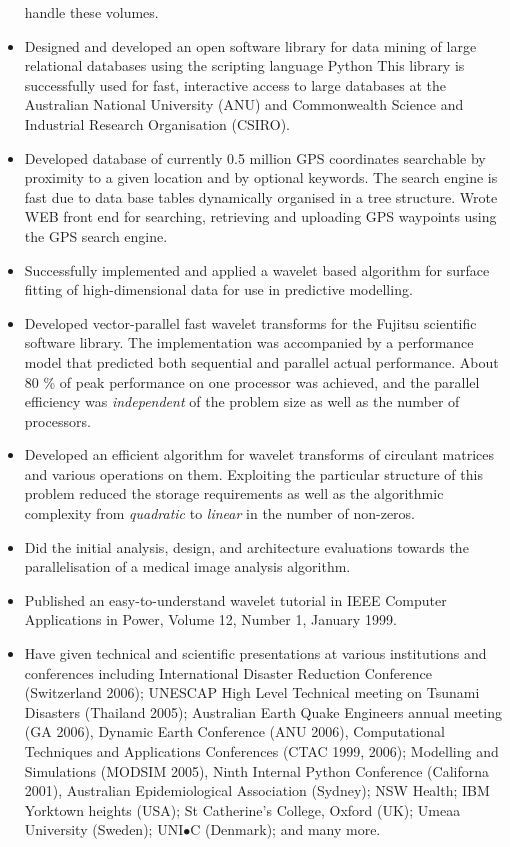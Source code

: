 \documentclass[12pt,a4paper]{article}
\begin{document}
\begin{itemize}
  handle these volumes. 
  \item Designed and developed an open software library for data mining
  of large relational databases using the scripting language Python
  This library is successfully used for fast, interactive access to large 
  databases at the Australian National University (ANU) and 
  Commonwealth Science and Industrial Research Organisation (CSIRO).
  \item Developed database of currently 0.5 million 
  GPS coordinates searchable by proximity to a given location 
  and by optional keywords. The search engine is fast
  due to data base tables dynamically organised in a tree structure. 
  Wrote WEB front end for searching, retrieving and uploading GPS waypoints
  using the GPS search engine.
  \item Successfully implemented and applied a wavelet based algorithm 
  for surface fitting of high-dimensional data for use in predictive modelling.
  \item Developed vector-parallel fast wavelet transforms
  for the Fujitsu scientific software library.
  The implementation was accompanied by a performance model that
  predicted both sequential and parallel actual performance.
  About 80 \% of peak performance on one processor was achieved,
  and the parallel efficiency was {\em independent} of the problem size
  as well as the number of processors. 
  \item Developed an efficient algorithm for 
  wavelet transforms of circulant matrices 
  and various operations on them.
  Exploiting the particular structure of this problem 
  reduced the storage requirements as well as the algorithmic complexity 
  from {\em quadratic} to {\em linear} in the number of non-zeros.
  \item Did the initial analysis, design, and architecture evaluations 
  towards the parallelisation of a medical image analysis algorithm.
  \item Published an easy-to-understand wavelet tutorial
  in IEEE Computer Applications in Power, Volume 12, Number 1, January 1999.
  \item Have given technical and scientific presentations at 
  various institutions and conferences including 
  International Disaster Reduction Conference (Switzerland 2006); 
  UNESCAP High Level Technical meeting on Tsunami Disasters (Thailand 2005); 
  Australian Earth Quake Engineers annual meeting (GA 2006), Dynamic Earth Conference (ANU 2006), 
  Computational Techniques and Applications Conferences (CTAC 1999, 2006); 
  Modelling and Simulations (MODSIM 2005), Ninth Internal Python Conference (Californa 2001), 
  Australian Epidemiological Association (Sydney); NSW Health; IBM Yorktown heights (USA); 
  St Catherine's College, Oxford (UK); Umeaa University (Sweden); 
  UNI$\bullet$C (Denmark); and many more.
\end{itemize} 
\end{document}
